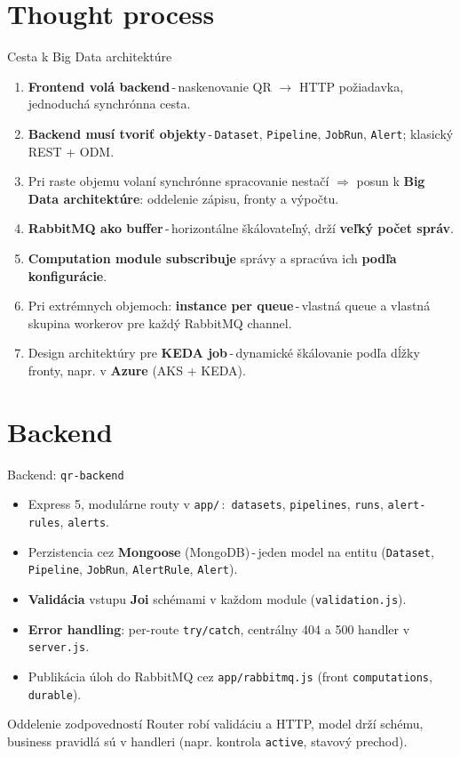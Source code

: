 \documentclass[aspectratio=169,11pt]{beamer}
\begin{document}
\section{Thought process}
\begin{frame}{Cesta k Big Data architektúre}
  \begin{enumerate}
    \item \textbf{Frontend volá backend}\,-\,naskenovanie QR $\to$ HTTP požiadavka, jednoduchá synchrónna cesta.
    \item \textbf{Backend musí tvoriť objekty}\,-\,\texttt{Dataset}, \texttt{Pipeline}, \texttt{JobRun}, \texttt{Alert}; klasický REST + ODM.
    \item Pri raste objemu volaní synchrónne spracovanie nestačí $\Rightarrow$ posun k \textbf{Big Data architektúre}: oddelenie zápisu, fronty a výpočtu.
    \item \textbf{RabbitMQ ako buffer}\,-\,horizontálne škálovateľný, drží \textbf{veľký počet správ}.
    \item \textbf{Computation module subscribuje} správy a spracúva ich \textbf{podľa konfigurácie}.
    \item Pri extrémnych objemoch: \textbf{instance per queue}\,-\,vlastná queue a vlastná skupina workerov pre každý RabbitMQ channel.
    \item Design architektúry pre \textbf{KEDA job}\,-\,dynamické škálovanie podľa dĺžky fronty, napr. v \textbf{Azure} (AKS + KEDA).
  \end{enumerate}
\end{frame}

\section{Backend}
\begin{frame}{Backend: \texttt{qr-backend}}
  \begin{itemize}
    \item Express 5, modulárne routy v \texttt{app/}\,:\, \texttt{datasets}, \texttt{pipelines}, \texttt{runs}, \texttt{alert-rules}, \texttt{alerts}.
    \item Perzistencia cez \textbf{Mongoose} (MongoDB)\,-\,jeden model na entitu (\texttt{Dataset}, \texttt{Pipeline}, \texttt{JobRun}, \texttt{AlertRule}, \texttt{Alert}).
    \item \textbf{Validácia} vstupu \textbf{Joi} schémami v každom module (\texttt{validation.js}).
    \item \textbf{Error handling}: per-route \texttt{try/catch}, centrálny 404 a 500 handler v \texttt{server.js}.
    \item Publikácia úloh do RabbitMQ cez \texttt{app/rabbitmq.js} (front \texttt{computations}, \texttt{durable}).
  \end{itemize}
  \begin{block}{Oddelenie zodpovedností}
    Router robí validáciu a HTTP, model drží schému, business pravidlá sú v handleri (napr. kontrola \texttt{active}, stavový prechod).
  \end{block}
\end{frame}
\end{document}
